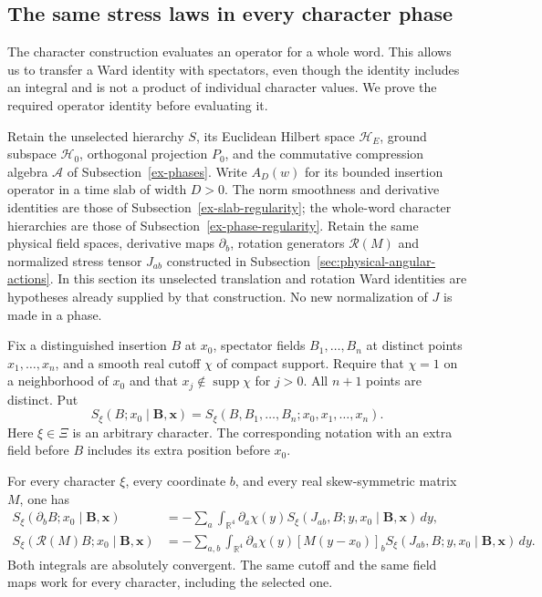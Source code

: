 \subsection{The same stress laws in every character phase}
\label{sec:phase-ward-inheritance}

The character construction evaluates an operator for a whole word. This
allows us to transfer a Ward identity with spectators, even though the
identity includes an integral and is not a product of individual character
values. We prove the required operator identity before evaluating it.

Retain the unselected hierarchy $S$, its Euclidean Hilbert space
$\mathcal H_E$, ground subspace $\mathcal H_0$, orthogonal projection $P_0$,
and the commutative compression algebra $\mathcal A$ of
Subsection~\ref{ex-phases}. Write $A_D(w)$ for its bounded insertion operator
in a time slab of width $D>0$. The norm smoothness and derivative identities
are those of Subsection~\ref{ex-slab-regularity}; the whole-word character
hierarchies are those of Subsection~\ref{ex-phase-regularity}. Retain the same
physical field spaces, derivative maps $\partial_b$, rotation generators
$\mathcal R(M)$ and normalized stress tensor $J_{ab}$ constructed in
Subsection~\ref{sec:physical-angular-actions}. In this section its unselected
translation and rotation Ward identities are hypotheses already supplied
by that construction. No new normalization of $J$ is made in a phase.

Fix a distinguished insertion $B$ at $x_0$, spectator fields
$B_1,\ldots,B_n$ at distinct points $x_1,\ldots,x_n$, and a smooth real
cutoff $\chi$ of compact support. Require that $\chi=1$ on a neighborhood
of $x_0$ and that $x_j\notin\operatorname{supp}\chi$ for $j>0$.
All $n+1$ points are distinct. Put
\[
 S_\xi(B;x_0\mid\boldsymbol B,\boldsymbol x)
   =S_\xi(B,B_1,\ldots,B_n;x_0,x_1,\ldots,x_n).
\]
Here $\xi\in\Xi$ is an arbitrary character. The corresponding notation
with an extra field before $B$ includes its extra position before $x_0$.

\begin{proposition}
\label{prop:phase-ward-inheritance}
For every character $\xi$, every coordinate $b$, and every real
skew-symmetric matrix $M$, one has
\begin{align}
 S_\xi(\partial_bB;x_0\mid\boldsymbol B,\boldsymbol x)
 &=-\sum_a\int_{\mathbb R^4}\partial_a\chi(y)
     S_\xi(J_{ab},B;y,x_0\mid\boldsymbol B,\boldsymbol x)\,dy,
 \label{eq:phase-translation-flux}\\
 S_\xi(\mathcal R(M)B;x_0\mid\boldsymbol B,\boldsymbol x)
 &=-\sum_{a,b}\int_{\mathbb R^4}\partial_a\chi(y)
      [M(y-x_0)]_b
     S_\xi(J_{ab},B;y,x_0\mid\boldsymbol B,\boldsymbol x)\,dy.
 \label{eq:phase-rotation-flux}
\end{align}
Both integrals are absolutely convergent. The same cutoff and the same
field maps work for every character, including the selected one.
\end{proposition}

